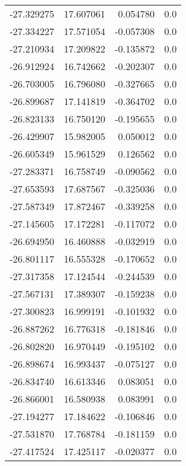 \begin{tabular}{rrrr}
      -27.329275 &        17.607061 &    0.054780 &   0.0 \\
      -27.334227 &        17.571054 &   -0.057308 &   0.0 \\
      -27.210934 &        17.209822 &   -0.135872 &   0.0 \\
      -26.912924 &        16.742662 &   -0.202307 &   0.0 \\
      -26.703005 &        16.796080 &   -0.327665 &   0.0 \\
      -26.899687 &        17.141819 &   -0.364702 &   0.0 \\
      -26.823133 &        16.750120 &   -0.195655 &   0.0 \\
      -26.429907 &        15.982005 &    0.050012 &   0.0 \\
      -26.605349 &        15.961529 &    0.126562 &   0.0 \\
      -27.283371 &        16.758749 &   -0.090562 &   0.0 \\
      -27.653593 &        17.687567 &   -0.325036 &   0.0 \\
      -27.587349 &        17.872467 &   -0.339258 &   0.0 \\
      -27.145605 &        17.172281 &   -0.117072 &   0.0 \\
      -26.694950 &        16.460888 &   -0.032919 &   0.0 \\
      -26.801117 &        16.555328 &   -0.170652 &   0.0 \\
      -27.317358 &        17.124544 &   -0.244539 &   0.0 \\
      -27.567131 &        17.389307 &   -0.159238 &   0.0 \\
      -27.300823 &        16.999191 &   -0.101932 &   0.0 \\
      -26.887262 &        16.776318 &   -0.181846 &   0.0 \\
      -26.802820 &        16.970449 &   -0.195102 &   0.0 \\
      -26.898674 &        16.993437 &   -0.075127 &   0.0 \\
      -26.834740 &        16.613346 &    0.083051 &   0.0 \\
      -26.866001 &        16.580938 &    0.083991 &   0.0 \\
      -27.194277 &        17.184622 &   -0.106846 &   0.0 \\
      -27.531870 &        17.768784 &   -0.181159 &   0.0 \\
      -27.417524 &        17.425117 &   -0.020377 &   0.0 \\

\end{tabular}
